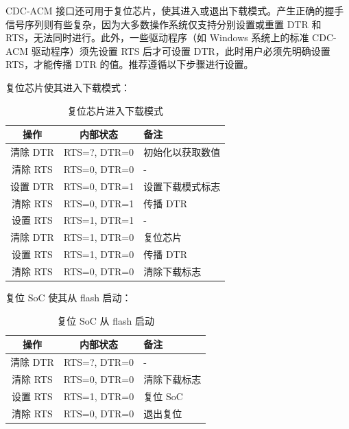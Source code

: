 \documentclass[main\_\_CN.tex]{subfiles}
\begin{document}
CDC-ACM 接口还可用于复位芯片，使其进入或退出下载模式。产生正确的握手信号序列则有些复杂，因为大多数操作系统仅支持分别设置或重置 DTR 和 RTS，无法同时进行。此外，一些驱动程序（如 Windows 系统上的标准 CDC-ACM 驱动程序）须先设置 RTS 后才可设置 DTR，此时用户必须先明确设置 RTS，才能传播 DTR 的值。推荐遵循以下步骤进行设置。

复位芯片使其进入下载模式：

\begin{table}[H]
\centering
\caption{复位芯片进入下载模式}
\label{tab:usbserialjtag-reset-soc-into-download-mode}

\begin{tabular} {|c|c|l|}\hline
\rowcolor{lightgray}
\textbf{操作} & \textbf{内部状态} & \textbf{备注} \\\hline

清除 DTR & RTS=?, DTR=0 & 初始化以获取数值 \\\hline
清除 RTS & RTS=0, DTR=0 & - \\\hline
设置 DTR & RTS=0, DTR=1 & 设置下载模式标志 \\\hline
清除 RTS & RTS=0, DTR=1 & 传播 DTR \\\hline
设置 RTS & RTS=1, DTR=1 & - \\\hline
清除 DTR & RTS=1, DTR=0 & 复位芯片 \\\hline
设置 RTS & RTS=1, DTR=0 & 传播 DTR \\\hline
清除 RTS & RTS=0, DTR=0 & 清除下载标志\\\hline
\end{tabular}
\end{table}

复位 SoC 使其从 flash 启动：

\begin{table}[H]
\centering
\caption{复位 SoC 从 flash 启动}
\label{tab:usbserialjtag-reset-soc-into-booting}

\begin{tabular} {|c|c|l|}\hline
\rowcolor{lightgray}
\textbf{操作} & \textbf{内部状态} & \textbf{备注} \\\hline

清除 DTR & RTS=?, DTR=0 & - \\\hline
清除 RTS & RTS=0, DTR=0 &  清除下载标志 \\\hline
设置 RTS & RTS=1, DTR=0 &  复位 SoC \\\hline
清除 RTS & RTS=0, DTR=0 & 退出复位 \\\hline
\end{tabular}
\end{table}
\end{document}
